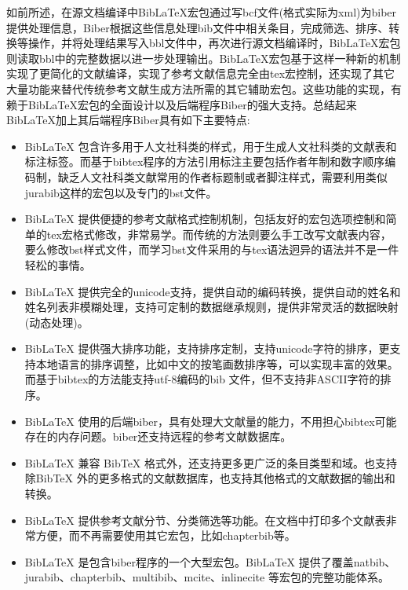 \documentclass[twoside]{article} %
\begin{document}
如前所述，在源文档编译中BibLaTeX宏包通过写bcf文件(格式实际为xml)为biber提供处理信息，Biber根据这些信息处理bib文件中相关条目，完成筛选、排序、转换等操作，并将处理结果写入bbl文件中，再次进行源文档编译时，BibLaTeX宏包则读取bbl中的完整数据以进一步处理输出。BibLaTeX宏包基于这样一种新的机制实现了更简化的文献编译，实现了参考文献信息完全由tex宏控制，还实现了其它大量功能来替代传统参考文献生成方法所需的其它辅助宏包。这些功能的实现，有赖于BibLaTeX宏包的全面设计以及后端程序Biber的强大支持。总结起来BibLaTeX加上其后端程序Biber具有如下主要特点:

\begin{itemize}
  \item BibLaTeX 包含许多用于人文社科类的样式，用于生成人文社科类的文献表和标注标签。而基于bibtex程序的方法引用标注主要包括作者年制和数字顺序编码制，缺乏人文社科类文献常用的作者标题制或者脚注样式，需要利用类似jurabib这样的宏包以及专门的bst文件。

  \item BibLaTeX 提供便捷的参考文献格式控制机制，包括友好的宏包选项控制和简单的tex宏格式修改，非常易学。而传统的方法则要么手工改写文献表内容，要么修改bst样式文件，而学习bst文件采用的与tex语法迥异的语法并不是一件轻松的事情。

  \item BibLaTeX 提供完全的unicode支持，提供自动的编码转换，提供自动的姓名和姓名列表非模糊处理，支持可定制的数据继承规则，提供非常灵活的数据映射(动态处理)。

  \item BibLaTeX 提供强大排序功能，支持排序定制，支持unicode字符的排序，更支持本地语言的排序调整，比如中文的按笔画数排序等，可以实现丰富的效果。而基于bibtex的方法能支持utf-8编码的bib 文件，但不支持非ASCII字符的排序。

  \item BibLaTeX 使用的后端biber，具有处理大文献量的能力，不用担心bibtex可能存在的内存问题。biber还支持远程的参考文献数据库。

  \item BibLaTeX 兼容 BibTeX 格式外，还支持更多更广泛的条目类型和域。也支持除BibTeX 外的更多格式的文献数据库，也支持其他格式的文献数据的输出和转换。

  \item BibLaTeX 提供参考文献分节、分类筛选等功能。在文档中打印多个文献表非常方便，而不再需要使用其它宏包，比如chapterbib等。

  \item BibLaTeX 是包含biber程序的一个大型宏包。BibLaTeX 提供了覆盖natbib、jurabib、chapterbib、multibib、mcite、inlinecite 等宏包的完整功能体系。

\end{itemize}
\end{document}
